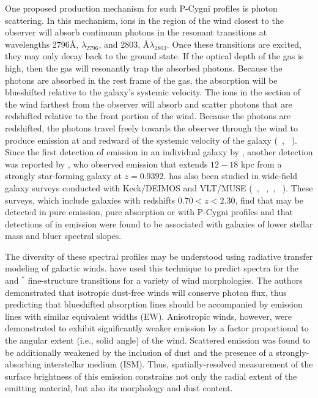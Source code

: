 \documentclass[twocolumn]{aastex61}
\newcommand{\citethnop}[1]{\citeauthor{#1}\ \citeyear{#1}}
\begin{document}
One proposed production mechanism for such P-Cygni profiles is photon scattering. In this mechanism,  ions in the region of the wind closest to the observer will absorb continuum photons in the resonant transitions at wavelengths 2796\AA, $\lambda_{2796}$, and 2803, \AA $\lambda_{2803}$. Once these transitions are excited, they may only decay back to the ground state. If the optical depth of the gas is high, then the gas will resonantly trap the absorbed photons. Because the photons are absorbed in the rest frame of the gas, the absorption will be blueshifted relative to the galaxy's systemic velocity. The  ions in the section of the wind farthest from the observer will absorb and scatter photons that are redshifted relative to the front portion of the wind. Because the photons are redshifted, the photons travel freely towards the observer through the wind to produce emission at and redward of the systemic velocity of the galaxy (\citethnop{Rubin_2011}, \citethnop{Prochaska_2011}). Since the first detection of  emission in an individual galaxy by \citet{Rubin_2011}, another detection was reported by \cite{Martin2013}, who observed  emission that extends $12-18$ kpc from a strongly star-forming galaxy
at $z=0.9392$.  has also been studied in wide-field galaxy surveys conducted with Keck/DEIMOS and VLT/MUSE  (\citethnop{Weiner2009}, \citethnop{Kornei2013},\citethnop{Erb2012}, \citethnop{Feltre2018}). These surveys, which include galaxies with redshifts $ 0.70 < z < 2.30$, find that  may be detected in pure emission, pure absorption or with P-Cygni profiles and that detections of  in emission were found to be associated with galaxies of lower stellar mass and bluer spectral slopes.

The diversity of these spectral profiles may be understood using radiative transfer modeling of galactic winds.
\citet{Prochaska_2011} have used this technique to predict 
spectra for the   and  $^*$ fine-structure transitions for a variety of wind morphologies.
The authors demonstrated that isotropic dust-free winds will conserve photon flux, thus predicting that blueshifted absorption lines should be accompanied by emission lines with similar equivalent widths (EW). Anisotropic winds, however, were demonstrated to exhibit significantly weaker emission by a factor proportional to the angular extent (i.e., solid angle) of the wind. Scattered emission was found to be additionally weakened by the inclusion of dust and the presence of a strongly-absorbing interstellar medium (ISM).
Thus, spatially-resolved measurement of the surface brightness of this emission constrains not only the radial extent of the emitting material, but also its morphology and dust content.
\end{document}
